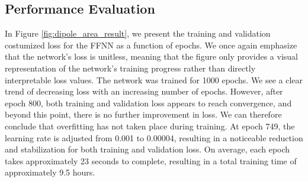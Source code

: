 \documentclass[a4paper, UKenglish, 11pt]{uiomaster}
\begin{document}



\subsection{Performance Evaluation}

In Figure \ref{fig:dipole_area_result}, we present the training and validation costumized loss for the FFNN as a function of epochs. We once again emphasize that the network's loss is unitless, meaning that the figure only provides a visual representation of the network's training progress rather than directly interpretable loss values. The network was trained for 1000 epochs. We see a clear trend of decreasing loss with an increasing number of epochs. However, after epoch 800, both training and validation loss appears to reach convergence, and beyond this point, there is no further improvement in loss. We can therefore conclude that overfitting has not taken place during training. At epoch 749, the learning rate is adjusted from 0.001 to 0.00004, resulting in a noticeable reduction and stabilization for both training and validation loss. On average, each epoch takes approximately 23 seconds to complete, resulting in a total training time of approximately 9.5 hours.
\end{document}
